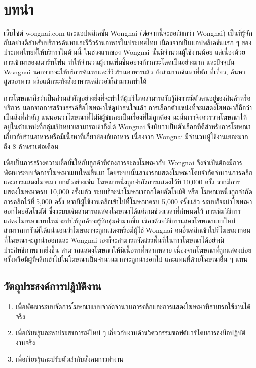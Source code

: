 \chapter{บทนำ}
\label{chapter:introduction}

เว็บไซต์ wongnai.com และแอปพลิเคชัน Wongnai (ต่อจากนี้จะขอเรียกว่า Wongnai) เป็นที่รู้จักกันอย่างดีสำหรับบริการค้นหาและรีวิวร้านอาหารในประเทศไทย เนื่องจากเป็นแอปพลิเคชันแรก ๆ ของประเทศไทยที่ให้บริการในด้านนี้ ในช่วงแรกของ Wongnai นั้นมีจำนวนผู้ใช้งานน้อย แต่เนื่องด้วยการเข้ามาของสมาร์ทโฟน ทำให้จำนวนผู้งานเพิ่มขึ้นอย่างก้าวกระโดดเป็นอย่างมาก และปัจจุบัน Wongnai นอกจากจะให้บริการค้นหาและรีวิวร้านอาหารแล้ว ยังสามารถค้นหาที่พัก-ที่เที่ยว, ค้นหาสูตรอาหาร หรือแม้กระทั่งสั่งอาหารเดลิเวอรีก็สามารถทำได้

การโฆษณาถือว่าเป็นส่วนสำคัญอย่างยิ่งที่จะทำให้ผู้บริโภคสามารถรับรู้ถึงการมีตัวตนอยู่ของสินค้าหรือบริการ นอกจากการสร้างสรรค์สื่อโฆษณาให้ดูน่าสนใจแล้ว การเลือกตำแหน่งที่จะแสดงโฆษณาก็ถือว่าเป็นสิ่งที่สำคัญ แน่นอนว่าโฆษณาที่ไม่มีผู้ชมเลยเป็นเรื่องที่ไม่ถูกต้อง ฉะนั้นเราจึงควรวางโฆษณาให้อยู่ในตำแหน่งที่กลุ่มเป้าหมายสามารถเข้าถึงได้ Wongnai จึงนับว่าเป็นตัวเลือกที่ดีสำหรับการโฆษณาเกี่ยวกับร้านอาหารหรือมีเนื้อหาที่เกี่ยวข้องกับอาหาร เนื่องจาก Wongnai มีจำนวนผู้ใช้งานเยอะมากถึง 8 ล้านรายต่อเดือน ~\cite{wongnai}

เพื่อเป็นการสร้างความเชื่อมั่นให้กับลูกค้าที่ต้องการจะลงโฆษณากับ Wongnai จึงจำเป็นต้องมีการพัฒนาระบบจัดการโฆษณาแบบใหม่ขึ้นมา โดยระบบนั้นสามารถแสดงโฆษณาโดยจำกัดจำนวนการคลิกและการแสดงโฆษณา ยกตัวอย่างเช่น โฆษณาหนึ่งถูกจำกัดการแสดงไว้ที่ 10,000 ครั้ง หากมีการแสดงโฆษณาครบ 10,000 ครั้งแล้ว ระบบก็จะนำโฆษณาออกโดยอัตโนมัติ หรือ โฆษณาหนึ่งถูกจำกัดการคลิกไว้ที่ 5,000 ครั้ง หากมีผู้ใช้งานคลิกเข้าไปที่โฆษณาครบ 5,000 ครั้งแล้ว ระบบก็จะนำโฆษณาออกโดยอัตโนมัติ ซึ่งระบบเดิมสามารถแสดงโฆษณาได้แค่ตามช่วงเวลาที่กำหนดไว้ การเพิ่มวิธีการแสดงโฆษณาแบบใหม่จะทำให้ลูกค้าจะรู้สึกคุ้มค่ามากขึ้น เนื่องด้วยวิธีการแสดงโฆษณาแบบใหม่สามารถการันตีได้แน่นอนว่าโฆษณาจะถูกแสดงหรือมีผู้ใช้ Wongnai คนอื่นคลิกเข้าไปที่โฆษณาก่อนที่โฆษณาจะถูกนำออกและ Wongnai เองก็จะสามารถจัดสรรพื้นที่ในการโฆษณาได้อย่างมีประสิทธิภาพมากยิ่งขึ้น สามารถแสดงโฆษณาให้มีเนื้อหาที่หลากหลาย เนื่องจากโฆษณาที่ถูกแสดงบ่อยครั้งหรือมีผู้ที่คลิกเข้าไปในโฆษณาเป็นจำนวนมากจะถูกนำออกไป และแทนที่ด้วยโฆษณาอื่น ๆ แทน

\section{วัตถุประสงค์การปฏิบัติงาน}
\begin{enumerate}
	\item เพื่อพัฒนาระบบจัดการโฆษณาแบบจำกัดจำนวนการคลิกและการแสดงโฆษณาที่สามารถใช้งานได้จริง
	\item เพื่อเรียนรู้และหาประสบการณ์ใหม่ ๆ เกี่ยวกับงานด้านวิศวกรรมซอฟต์แวร์โดยการลงมือปฏิบัติงานจริง
	\item เพื่อเรียนรู้และปรับตัวเข้ากับสังคมการทำงาน
\end{enumerate}

